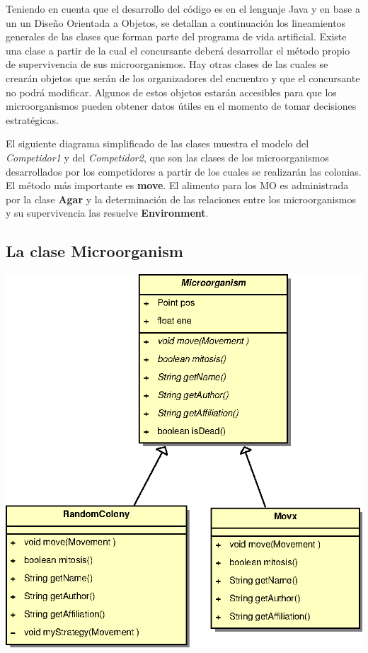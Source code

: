 \documentclass[11pt,a4paper]{article}
\begin{document}
Teniendo en cuenta que el desarrollo del código es en el lenguaje Java y en base a un un Diseño Orientada a Objetos, se detallan a continuación los lineamientos generales de las clases que forman parte del programa de vida artificial.
Existe una clase a partir de la cual el concursante deberá desarrollar el método propio de supervivencia de sus microorganismos. Hay otras clases de las cuales se crearán objetos que serán de los organizadores del encuentro y que el concursante no podrá modificar. Algunos de estos objetos estarán accesibles para que los microorganismos pueden obtener datos útiles en el momento de tomar decisiones estratégicas.

El siguiente diagrama simplificado de las clases muestra el modelo del {\it Competidor1 } y del {\it Competidor2}, que son las clases de los microorganismos desarrollados por los competidores a partir de los cuales se realizarán las colonias. El método más importante es {\bf move}. El alimento para los MO es administrada por la clase {\bf Agar} y la determinación de las relaciones entre los microorganismos y su supervivencia las resuelve {\bf Environment}.

\subsection{La clase Microorganism}
\begin{center}
\includegraphics[scale=0.6]{microorganism}
\end{center}
\end{document}
